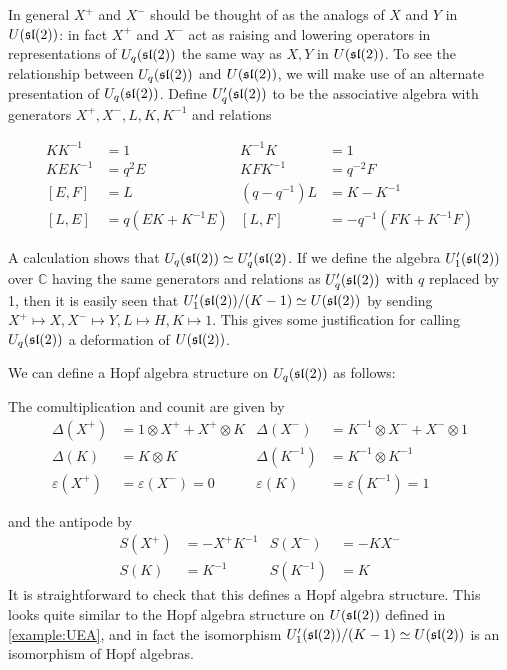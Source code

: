 In general $ X^+ $ and $X^-$ should be thought of as the analogs of $X$ and $Y$
in $U(\mathfrak{sl}(2))$: in fact $X^+$ and $X^-$ act as raising and lowering operators
in representations of $U_q(\mathfrak{sl}(2))$ the same way as $X,Y$ in $U(\mathfrak{sl}(2))$. To
see the relationship between $U_q(\mathfrak{sl}(2))$ and $U(\mathfrak{sl}(2))$, we will make use
of an alternate presentation of $U_q(\mathfrak{sl}(2))$.  Define $U'_q(\mathfrak{sl}(2))$ to be
the associative algebra with generators $ X^+ ,X^-,L,K,K^{-1}$ and relations

\begin{align}
    KK^{-1} &= 1 &  K^{-1}K  &=1 \\
    KEK^{-1} &= q^2 E & KFK^{-1} &= q^{-2} F \\
    [E,F] &= L  & (q - q^{-1})L &= K-K^{-1} \\
    [L,E] &= q(EK + K^{-1}E) & [L,F] &= -q^{-1}(FK + K^{-1}F)
\end{align}

A calculation shows that $U_q(\mathfrak{sl}(2)) \simeq U_q'(\mathfrak{sl}(2)$. If we define the
algebra $U_1'(\mathfrak{sl}(2))$ over $\mathbb{C}$ having the same generators and
relations as $U_q'(\mathfrak{sl}(2))$ with $q$ replaced by 1, then it is easily seen
that $U_1'(\mathfrak{sl}(2)) /(K-1) \simeq U(\mathfrak{sl}(2))$ by sending $X^+ \mapsto X, X^-
\mapsto Y, L \mapsto H, K \mapsto 1$. This gives some  justification for
calling $U_q(\mathfrak{sl}(2))$ a deformation of $U(\mathfrak{sl}(2))$.

We can define a Hopf algebra structure on $U_q(\mathfrak{sl}(2))$ as follows:

The comultiplication and counit are given by
\begin{align}
    \Delta(X^+) &= 1 \otimes  X^+  +  X^+  \otimes K &  \Delta(X^-) &= K^{-1} \otimes X^- + X^- \otimes 1 \\
    \Delta(K) &= K \otimes K &  \Delta(K^{-1}) &= K^{-1} \otimes K^{-1}\\ 
    \varepsilon( X^+ ) &= \varepsilon(X^-) = 0 &  \varepsilon(K) &= \varepsilon(K^{-1}) = 1
\end{align}

and the antipode by
\begin{align}
    S(X^+) &= - X^+ K^{-1} & S(X^-)      &= -KX^- \\
    S(K) &= K^{-1}   & S(K^{-1}) &= K 
\end{align}
It is straightforward to check that this defines a Hopf algebra structure. This
looks quite similar to the Hopf algebra structure on $U(\mathfrak{sl}(2))$ defined in
\ref{example:UEA}, and in fact the isomorphism $U_1'(\mathfrak{sl}(2)) /(K-1)
\simeq U(\mathfrak{sl}(2))$ is an isomorphism of Hopf algebras.

